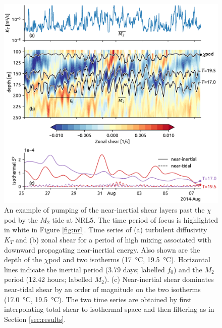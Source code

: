 \documentclass[twocol]{ametsoc}
\begin{document}
\begin{figure}
\centering
\includegraphics[width=\textwidth]{figure9-tidal-pumping.pdf}
\caption{\label{fig:nrl5-niw}
An example of pumping of the near-inertial shear layers past the \(\chi\)pod by the \(M_2\) tide at NRL5. The time period of focus is highlighted in white in Figure \ref{fig:nrl}. Time series of (a) turbulent diffusivity \(K_T\) and (b) zonal shear for a period of high mixing associated with downward propagating near-inertial energy. Also shown are the depth of the \(\chi\)pod and two isotherms (\SI{17}{\celsius}, \SI{19.5}{\celsius}). Horizontal lines indicate the inertial period (3.79 days; labelled \(f_0\)) and the \(M_2\) period (12.42 hours; labelled \(M_2\)). (c) Near-inertial shear dominates near-tidal shear by an order of magnitude on the two isotherms (\SI{17.0}{\celsius}, \SI{19.5}{\celsius}). The two time series are obtained by first interpolating total shear to isothermal space and then filtering as in Section \ref{sec:results}.}
\end{figure}
\end{document}
